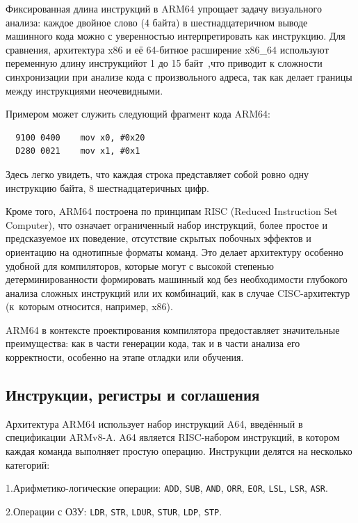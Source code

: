 \documentclass[utf8]{lgu}
\newcommand{\tire}{\unskip\nobreak\thinspace\textemdash\thinspace}
\newcommand{\code}[1]{{\normalsize\texttt{#1}}}
\begin{document}
Фиксированная длина инструкций в ARM64 упрощает задачу визуального анализа: каждое двойное слово (4 байта) в шестнадцатеричном выводе машинного кода можно с уверенностью интерпретировать как инструкцию. Для сравнения, архитектура x86 и её 64-битное расширение x86\_64 используют переменную длину инструкций\tire от 1 до 15 байт~\cite{x86and64},\tire что приводит к сложности синхронизации при анализе кода с произвольного адреса, так как делает границы между инструкциями неочевидными.

Примером может служить следующий фрагмент кода ARM64:

{\small\begin{verbatim}
  9100 0400    mov x0, #0x20
  D280 0021    mov x1, #0x1
\end{verbatim}}

Здесь легко увидеть, что каждая строка представляет собой ровно одну инструкцию\tire 4 байта, 8 шестнадцатеричных цифр.

Кроме того, ARM64 построена по принципам RISC (Reduced Instruction Set Computer), что означает ограниченный набор инструкций, более простое и предсказуемое их поведение, отсутствие скрытых побочных эффектов и ориентацию на однотипные форматы команд. Это делает архитектуру особенно удобной для компиляторов, которые могут с высокой степенью детерминированности формировать машинный код без необходимости глубокого анализа сложных инструкций или их комбинаций, как в случае CISC-архитектур (к~которым относится, например, x86).

ARM64 в контексте проектирования компилятора предоставляет значительные преимущества: как в части генерации кода, так и в части анализа его корректности, особенно на этапе отладки или обучения.

\subsection{Инструкции, регистры и соглашения}

\firstparskip Архитектура ARM64 использует набор инструкций A64, введённый в спецификации ARMv8-A. A64 является RISC-набором инструкций, в котором каждая команда выполняет простую операцию. Инструкции делятся на несколько категорий:

1.\hspace{0.5em}Арифметико-логические операции: \code{ADD}, \code{SUB}, \code{AND}, \code{ORR}, \code{EOR}, \code{LSL}, \code{LSR}, \code{ASR}.

2.\hspace{0.5em}Операции с ОЗУ: \code{LDR}, \code{STR}, \code{LDUR}, \code{STUR}, \code{LDP}, \code{STP}.
\end{document}
